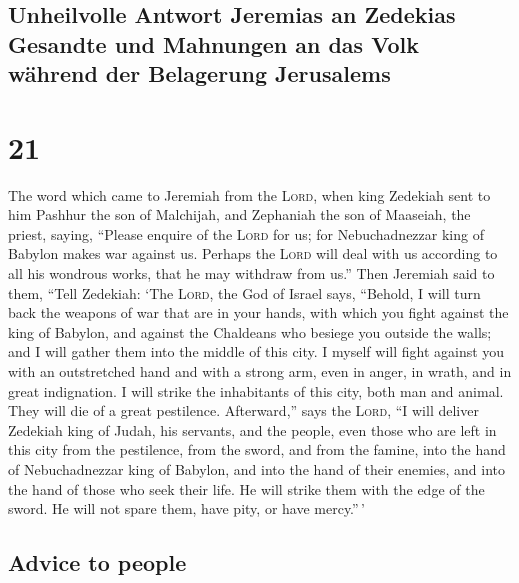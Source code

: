 \hypertarget{unheilvolle-antwort-jeremias-an-zedekias-gesandte-und-mahnungen-an-das-volk-wuxe4hrend-der-belagerung-jerusalems}{%
\subsection{Unheilvolle Antwort Jeremias an Zedekias Gesandte und
Mahnungen an das Volk während der Belagerung
Jerusalems}\label{unheilvolle-antwort-jeremias-an-zedekias-gesandte-und-mahnungen-an-das-volk-wuxe4hrend-der-belagerung-jerusalems}}

\hypertarget{section-20}{%
\section{21}\label{section-20}}

 The word which came to Jeremiah from the \textsc{Lord},
when king Zedekiah sent to him Pashhur the son of Malchijah, and
Zephaniah the son of Maaseiah, the priest, saying, 
``Please enquire of the \textsc{Lord} for us; for Nebuchadnezzar king of
Babylon makes war against us. Perhaps the \textsc{Lord} will deal with
us according to all his wondrous works, that he may withdraw from us.''
 Then Jeremiah said to them, ``Tell Zedekiah:
 `The \textsc{Lord}, the God of Israel says, ``Behold, I
will turn back the weapons of war that are in your hands, with which you
fight against the king of Babylon, and against the Chaldeans who besiege
you outside the walls; and I will gather them into the middle of this
city.  I myself will fight against you with an
outstretched hand and with a strong arm, even in anger, in wrath, and in
great indignation.  I will strike the inhabitants of this
city, both man and animal. They will die of a great pestilence.
 Afterward,'' says the \textsc{Lord}, ``I will deliver
Zedekiah king of Judah, his servants, and the people, even those who are
left in this city from the pestilence, from the sword, and from the
famine, into the hand of Nebuchadnezzar king of Babylon, and into the
hand of their enemies, and into the hand of those who seek their life.
He will strike them with the edge of the sword. He will not spare them,
have pity, or have mercy.''\,'

\hypertarget{advice-to-people}{%
\subsection{Advice to people}\label{advice-to-people}}

